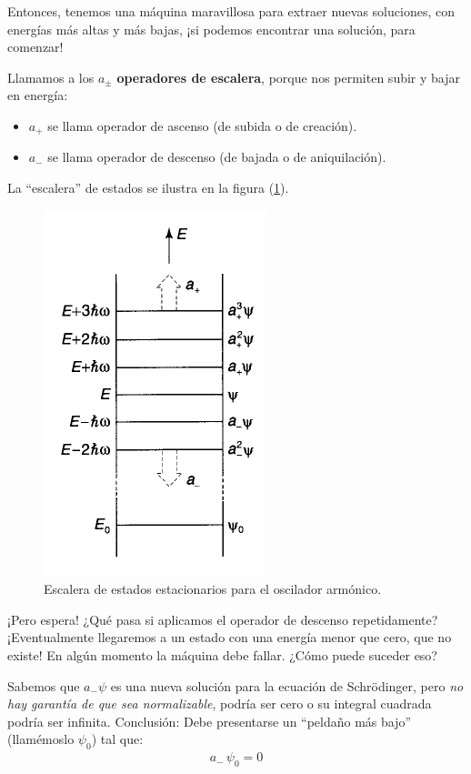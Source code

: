 Entonces, tenemos una máquina maravillosa para extraer nuevas soluciones, con energías más altas y más bajas, ¡si podemos encontrar una solución, para comenzar!
\par
Llamamos a los $a_{\pm}$ \textbf{operadores de escalera}, porque nos permiten subir y bajar en energía:
\begin{itemize}
\item $a_{+}$ se llama operador de ascenso (de subida o de creación).
\item $a_{-}$ se llama operador de descenso (de bajada o de aniquilación).
\end{itemize}
La \enquote{escalera} de estados se ilustra en la figura (\ref{fig:figura_002}).
\begin{figure}[H]
    \centering
    \includegraphics[scale=0.7]{Imagenes/Operadores_escalera.png}
    \caption{Escalera de estados estacionarios para el oscilador armónico.}
    \label{fig:figura_002}
\end{figure}
¡Pero espera! ¿Qué pasa si aplicamos el operador de descenso repetidamente? ¡Eventualmente llegaremos a un estado con una energía menor que cero, que no existe! En algún momento la máquina debe fallar. ¿Cómo puede suceder eso? 
\par
Sabemos que $a_{-} \psi$ es una nueva solución para la ecuación de Schrödinger, pero \emph{no hay garantía de que sea normalizable}, podría ser cero o su integral cuadrada podría ser infinita. Conclusión: Debe presentarse un \enquote{peldaño más bajo} (llamémoslo $\psi_{0}$) tal que:
\begin{align}
a_{-} \, \psi_{0} = 0
\label{eq:ecuacion_02_058}
\end{align}
